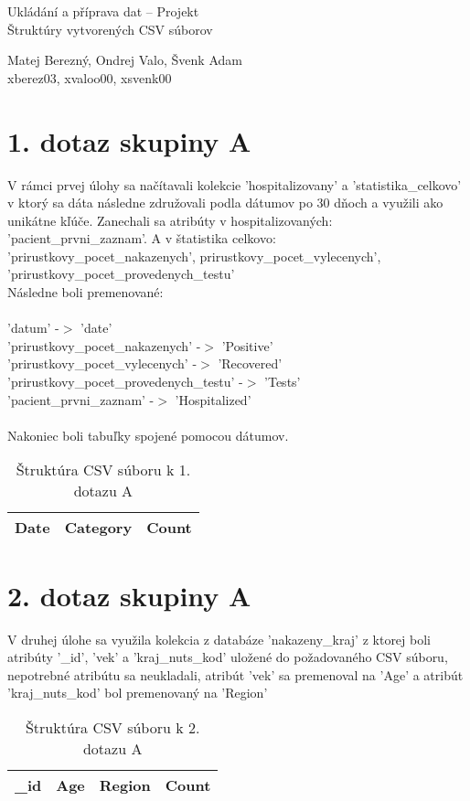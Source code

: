 \documentclass[a4paper, 16pt]{article}
\begin{document}
    			\begin{center}
				{\LARGE
					Ukládání a příprava dat -- Projekt \\
					{\Large
					    Štruktúry vytvorených CSV súborov \\[5mm]
					}
				}
				{\large
					Matej Berezný, Ondrej Valo, Švenk Adam \\	{\small xberez03, xvaloo00, xsvenk00}
					
				}
			\end{center}
			\vspace{0.7cm}

\section{1. dotaz skupiny A}
V rámci prvej úlohy sa načítavali kolekcie 'hospitalizovany' a 'statistika\_celkovo' v ktorý sa dáta následne združovali podla dátumov po 30 dňoch a využili ako unikátne kľúče. Zanechali sa atribúty v hospitalizovaných: 'pacient\_prvni\_zaznam'.
A v štatistika celkovo: 'prirustkovy\_pocet\_nakazenych', prirustkovy\_pocet\_vylecenych', 'prirustkovy\_pocet\_provedenych\_testu'\\
Následne boli premenované:\\\\
'datum' -$>$ 'date'\\
'prirustkovy\_pocet\_nakazenych' -$>$ 'Positive'\\
'prirustkovy\_pocet\_vylecenych' -$>$ 'Recovered'\\
'prirustkovy\_pocet\_provedenych\_testu' -$>$ 'Tests'\\
'pacient\_prvni\_zaznam' -$>$ 'Hospitalized'\\\\
Nakoniec boli tabuľky spojené pomocou dátumov.
\begin{table}[H]\centering
\begin{tabular}{|l|l|l|}
\hline
\textbf{Date} & Category  & Count  \\ \hline
\end{tabular}
\caption{Štruktúra CSV súboru k 1. dotazu A}
\end{table}


\section{2. dotaz skupiny A}
V druhej úlohe sa využila kolekcia z databáze 'nakazeny\_kraj' z ktorej boli atribúty '\_id', 'vek' a 'kraj\_nuts\_kod' uložené do požadovaného CSV súboru, nepotrebné atribútu sa neukladali, atribút 'vek' sa premenoval na 'Age' a atribút 'kraj\_nuts\_kod' bol premenovaný na 'Region'
\begin{table}[H]\centering
\begin{tabular}{|l|l|l|l|}
\hline
\textbf{\_id} & Age  & Region & Count \\ \hline
\end{tabular}
\caption{Štruktúra CSV súboru k 2. dotazu A}
\end{table}
\end{document}
